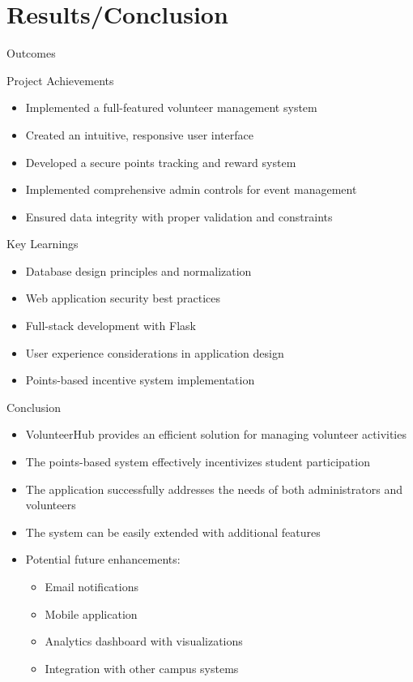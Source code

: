 \documentclass{beamer}
\begin{document}
\section{Results/Conclusion}

\begin{frame}{Outcomes}
\setlength{\itemsep}{2pt}
  \begin{block}{Project Achievements}
    \begin{itemize}
      \item Implemented a full-featured volunteer management system
      \item Created an intuitive, responsive user interface
      \item Developed a secure points tracking and reward system
      \item Implemented comprehensive admin controls for event management
      \item Ensured data integrity with proper validation and constraints
    \end{itemize}
  \end{block}
  \vspace{-0.3em}
  \begin{block}{Key Learnings}
    \begin{itemize}
      \item Database design principles and normalization
      \item Web application security best practices
      \item Full-stack development with Flask
      \item User experience considerations in application design
      \item Points-based incentive system implementation
    \end{itemize}
  \end{block}
\end{frame}

\begin{frame}{Conclusion}
  \begin{itemize}
    \item VolunteerHub provides an efficient solution for managing volunteer activities
    \item The points-based system effectively incentivizes student participation
    \item The application successfully addresses the needs of both administrators and volunteers
    \item The system can be easily extended with additional features
    \item Potential future enhancements:
      \begin{itemize}
        \item Email notifications
        \item Mobile application
        \item Analytics dashboard with visualizations
        \item Integration with other campus systems
      \end{itemize}
  \end{itemize}
\end{frame}
\end{document}
